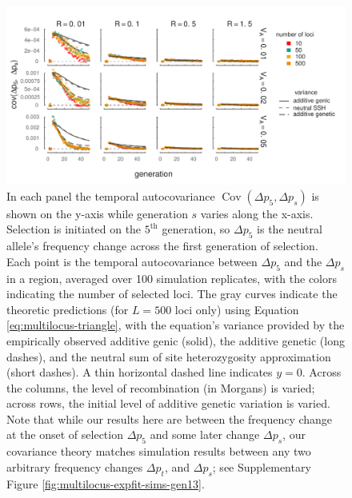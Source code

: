 \documentclass[11pt]{article}
\DeclareMathOperator{\cov}{Cov}
\begin{document}
\begin{figure}[!ht]
  \centering
  \includegraphics{./images/sim-pred-covs-varyl-alt.pdf}

  \caption{ In each panel the temporal autocovariance $\cov(\Delta p_5, \Delta
    p_s)$ is shown on the y-axis while generation $s$ varies along the x-axis.
    Selection is initiated on the $5^\text{th}$ generation, so $\Delta p_5$ is
    the neutral allele's frequency change across the first generation of
    selection. Each point is the temporal autocovariance between $\Delta p_5$
    and the $\Delta p_s$ in a region, averaged over 100 simulation replicates,
    with the colors indicating the number of selected loci. The gray curves
    indicate the theoretic predictions (for $L=500$ loci only) using Equation
    \eqref{eq:multilocus-triangle}, with the equation's variance provided by
    the empirically observed additive genic (solid), the additive genetic (long
    dashes), and the neutral sum of site heterozygosity approximation (short
    dashes). A thin horizontal dashed line indicates $y=0$.  Across the
    columns, the level of recombination (in Morgans) is varied; across rows,
    the initial level of additive genetic variation is varied.  Note that while
    our results here are between the frequency change at the onset of selection
    $\Delta p_5$ and some later change $\Delta p_s$, our covariance theory
    matches simulation results between any two arbitrary frequency changes
  $\Delta p_t$, and $\Delta p_s$; see Supplementary Figure
\ref{fig:multilocus-expfit-sims-gen13}.}

  \label{fig:multilocus-expfit-sims}
\end{figure}
\end{document}

